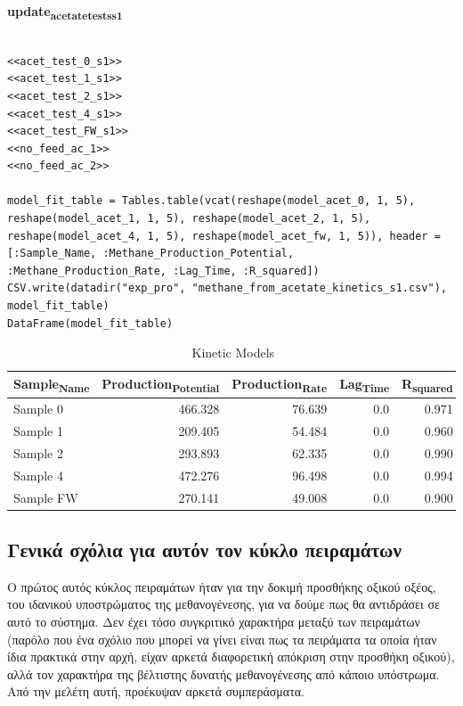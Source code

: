\documentclass[11pt]{article}
\begin{document}
\textbf{update\textsubscript{acetate}\textsubscript{tests}\textsubscript{s1}}
\begin{verbatim}

<<acet_test_0_s1>>
<<acet_test_1_s1>>
<<acet_test_2_s1>>
<<acet_test_4_s1>>
<<acet_test_FW_s1>>
<<no_feed_ac_1>>
<<no_feed_ac_2>>

model_fit_table = Tables.table(vcat(reshape(model_acet_0, 1, 5), reshape(model_acet_1, 1, 5), reshape(model_acet_2, 1, 5), reshape(model_acet_4, 1, 5), reshape(model_acet_fw, 1, 5)), header = [:Sample_Name, :Methane_Production_Potential, :Methane_Production_Rate, :Lag_Time, :R_squared])
CSV.write(datadir("exp_pro", "methane_from_acetate_kinetics_s1.csv"), model_fit_table)
DataFrame(model_fit_table)

\end{verbatim}

\begin{table}[htbp]
\caption{Kinetic Models}
\centering
\begin{tabular}{lrrrr}
Sample\textsubscript{Name} & Production\textsubscript{Potential} & Production\textsubscript{Rate} & Lag\textsubscript{Time} & R\textsubscript{squared}\\[0pt]
\hline
Sample 0 & 466.328 & 76.639 & 0.0 & 0.971\\[0pt]
Sample 1 & 209.405 & 54.484 & 0.0 & 0.960\\[0pt]
Sample 2 & 293.893 & 62.335 & 0.0 & 0.990\\[0pt]
Sample 4 & 472.276 & 96.498 & 0.0 & 0.994\\[0pt]
Sample FW & 270.141 & 49.008 & 0.0 & 0.900\\[0pt]
\end{tabular}
\end{table}

\subsection{Γενικά σχόλια για αυτόν τον κύκλο πειραμάτων}
\label{sec:org7cfc4b6}
Ο πρώτος αυτός κύκλος πειραμάτων ήταν για την δοκιμή προσθήκης οξικού οξέος, του ιδανικού υποστρώματος της μεθανογένεσης, για να δούμε πως θα αντιδράσει σε αυτό το σύστημα. Δεν έχει τόσο συγκριτικό χαρακτήρα μεταξύ των πειραμάτων (παρόλο που ένα σχόλιο που μπορεί να γίνει είναι πως τα πειράματα τα οποία ήταν ίδια πρακτικά στην αρχή, είχαν αρκετά διαφορετική απόκριση στην προσθήκη οξικού), αλλά τον χαρακτήρα της βέλτιστης δυνατής μεθανογένεσης από κάποιο υπόστρωμα. Από την μελέτη αυτή, προέκυψαν αρκετά συμπεράσματα.
\end{document}
